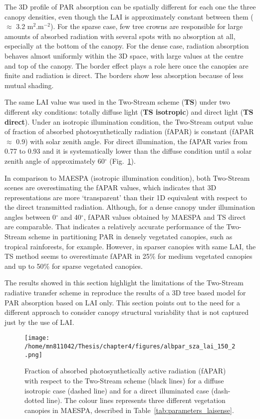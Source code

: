 \documentclass[a4paper,11pt]{report}
\begin{document}
The 3D profile of PAR absorption can be spatially different for each one the three canopy densities, even though the LAI is approximately constant between them ($\approx$ 3.2 m$^2$.m$^{-2}$). For the sparse case, few tree crowns are responsible for large amounts of absorbed radiation with several spots with no absorption at all, especially at the bottom of the canopy. For the dense case, radiation absorption behaves almost uniformly within the 3D space, with large values at the centre and top of the canopy. The border effect plays a role here once the canopies are finite and radiation is direct. The borders show less absorption because of less mutual shading. 

The same LAI value was used in the Two-Stream scheme (\textbf{TS}) under two different sky conditions: totally diffuse light (\textbf{TS isotropic}) and direct light (\textbf{TS direct}). Under an isotropic illumination condition, the Two-Stream output value of fraction of absorbed photosynthetically radiation (fAPAR) is constant (fAPAR $\approx$ 0.9) with solar zenith angle. For direct illumination, the fAPAR varies from 0.77 to 0.93 and it is systematically lower than the diffuse condition until a solar zenith angle of approximately 60$^{\circ}$ (Fig.~\ref{f:ts_maespa}).

In comparison to MAESPA (isotropic illumination condition), both Two-Stream scenes are overestimating the fAPAR values, which indicates that 3D representations are more `transparent' than their 1D equivalent with respect to the direct transmitted radiation. Although, for a dense canopy under illumination angles between 0$^{\circ}$ and 40$^{\circ}$, fAPAR values obtained by MAESPA and TS direct are comparable. That indicates a relatively accurate performance of the Two-Stream scheme in partitioning PAR in densely vegetated canopies, such as tropical rainforests, for example. However, in sparser canopies with same LAI, the TS method seems to overestimate fAPAR in 25\% for medium vegetated canopies and up to 50\% for sparse vegetated canopies. 

The results showed in this section highlight the limitations of the Two-Stream radiative transfer scheme in reproduce the results of a 3D tree based model for PAR absorption based on LAI only. This section points out to the need for a different approach to consider canopy structural variability that is not captured just by the use of LAI. 

\begin{figure}
\centering

\texttt{[image: /home/mn811042/Thesis/chapter4/figures/albpar\_sza\_lai\_150\_2.png]}
\caption{Fraction of absorbed photosynthetically active radiation (fAPAR) with respect to the Two-Stream scheme (black lines) for a diffuse isotropic case (dashed line) and for a direct illuminated case (dash-dotted line). The colour lines represents three different vegetation canopies in MAESPA, described in Table~\ref{tab:parameters_laisense}.} 
\label{f:ts_maespa}
\end{figure}
\end{document}
